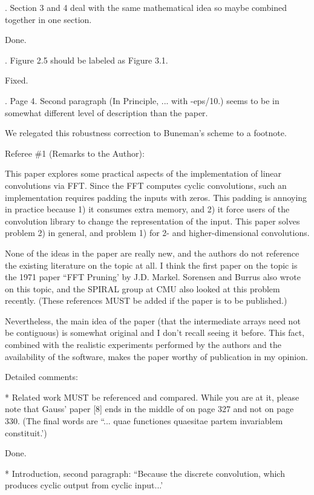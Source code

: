 \documentclass[11pt]{letter}
\begin{document}
\begin{letter}
. Section 3 and 4 deal with the same mathematical idea so maybe combined together in one section. 
\eq

Done.

. Figure 2.5 should be labeled as Figure 3.1. 
\eq

Fixed.

. Page 4. Second paragraph (In Principle, ... with -eps/10.) seems to be in somewhat different level of description than the paper. 
\eq 

We relegated this robustness correction to Buneman's scheme to a footnote.

\bq 
Referee \#1 (Remarks to the Author): 
 
This paper explores some practical aspects of the implementation of 
linear convolutions via FFT. Since the FFT computes cyclic 
convolutions, such an implementation requires padding the inputs with 
zeros. This padding is annoying in practice because 1) it consumes 
extra memory, and 2) it force users of the convolution library to 
change the representation of the input. This paper solves problem 2) 
in general, and problem 1) for 2- and higher-dimensional convolutions. 
 
None of the ideas in the paper are really new, and the authors do not 
reference the existing literature on the topic at all. I think the 
first paper on the topic is the 1971 paper ``FFT Pruning' by 
J.D. Markel. Sorensen and Burrus also wrote on this topic, and the 
SPIRAL group at CMU also looked at this problem recently. (These 
references MUST be added if the paper is to be published.) 
 
Nevertheless, the main idea of the paper (that the intermediate arrays 
need not be contiguous) is somewhat original and I don't recall seeing 
it before. This fact, combined with the realistic experiments 
performed by the authors and the availability of the software, makes 
the paper worthy of publication in my opinion. 
 
Detailed comments: 
 
* Related work MUST be referenced and compared. While you are at it, 
 please note that Gauss' paper [8] ends in the middle of on page 327 
 and not on page 330. (The final words are ``... quae functiones 
 quaesitae partem invariablem constituit.') 
\eq
 
Done.

\bq
* Introduction, second paragraph: ``Because the discrete 
 convolution, which produces cyclic output from cyclic input...' 
 

\end{letter}
\end{document}
